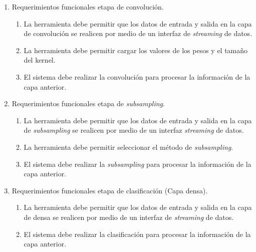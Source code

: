 \documentclass[11pt]{charter}
\begin{document}
\begin{enumerate}

\item Requerimientos funcionales etapa de convolución. 
	\begin{enumerate}
	\item La herramienta debe permitir que los datos de entrada y salida en la capa de convolución se realicen por medio de un interfaz de \textit{streaming} de datos. 
	\item La herramienta debe permitir cargar los valores de los pesos y el tamaño del kernel.
	\item El sistema debe realizar la convolución para procesar la información de la capa anterior.
	\end{enumerate}

\item Requerimientos funcionales etapa de \textit{subsampling}. 
	\begin{enumerate}
	\item La herramienta debe permitir que los datos de entrada y salida en la capa de \textit{subsampling} se realicen por medio de un interfaz \textit{streaming} de datos. 
	\item La herramienta debe permitir seleccionar el método de \textit{subsampling}.
	\item El sistema debe realizar la \textit{subsampling} para procesar la información de la capa anterior.
	\end{enumerate}

\item Requerimientos funcionales etapa de clasificación (Capa densa). 
	\begin{enumerate}
	\item La herramienta debe permitir que los datos de entrada y salida en la capa de densa se realicen por medio de un interfaz de \textit{streaming} de datos. 
	\item El sistema debe realizar la clasificación para procesar la información de la capa anterior.
	\end{enumerate}


\end{enumerate}
\end{document}

